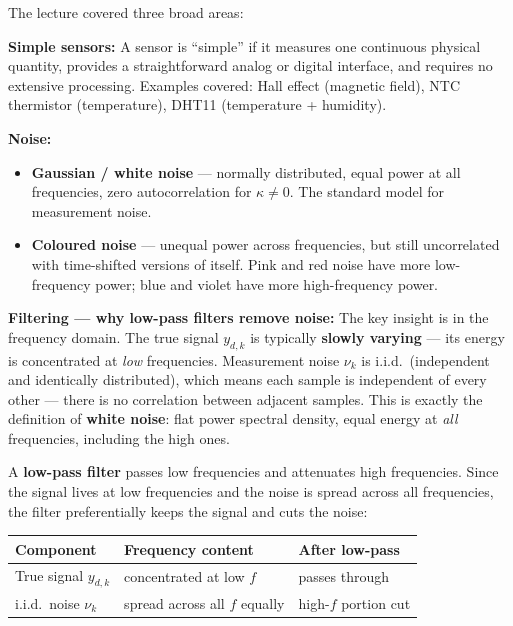 \documentclass[12pt, a4paper]{article}
\begin{document}
The lecture covered three broad areas:

\textbf{Simple sensors:} A sensor is ``simple'' if it measures one
continuous physical quantity, provides a straightforward analog or
digital interface, and requires no extensive processing. Examples
covered: Hall effect (magnetic field), NTC thermistor (temperature),
DHT11 (temperature + humidity).

\textbf{Noise:}
\begin{itemize}[leftmargin=1.5em]
  \item \textbf{Gaussian / white noise} --- normally distributed,
        equal power at all frequencies, zero autocorrelation for
        $\kappa \neq 0$. The standard model for measurement noise.
  \item \textbf{Coloured noise} --- unequal power across frequencies,
        but still uncorrelated with time-shifted versions of itself.
        Pink and red noise have more low-frequency power; blue and
        violet have more high-frequency power.
\end{itemize}

\textbf{Filtering --- why low-pass filters remove noise:}
The key insight is in the frequency domain. The true signal $y_{d,k}$
is typically \textbf{slowly varying} --- its energy is concentrated at
\emph{low} frequencies. Measurement noise $\nu_k$ is i.i.d.\
(independent and identically distributed), which means each sample is
independent of every other --- there is no correlation between adjacent
samples. This is exactly the definition of \textbf{white noise}: flat
power spectral density, equal energy at \emph{all} frequencies,
including the high ones.

A \textbf{low-pass filter} passes low frequencies and attenuates high
frequencies. Since the signal lives at low frequencies and the noise is
spread across all frequencies, the filter preferentially keeps the signal
and cuts the noise:

\begin{center}
\small
\begin{tabular}{lll}
  \textbf{Component} & \textbf{Frequency content} & \textbf{After low-pass} \\
  \hline
  True signal $y_{d,k}$ & concentrated at low $f$ & passes through \\
  i.i.d.\ noise $\nu_k$ & spread across all $f$ equally & high-$f$ portion cut \\
\end{tabular}
\end{center}
\end{document}
